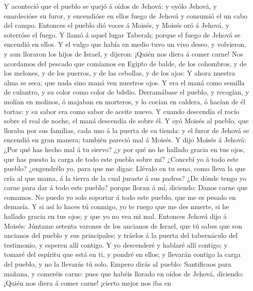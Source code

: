  Y aconteció que el pueblo se quejó á oídos de Jehová: y
oyólo Jehová, y enardecióse su furor, y encendióse en ellos fuego de
Jehová y consumió el un cabo del campo.  Entonces el pueblo
dió voces á Moisés, y Moisés oró á Jehová, y soterróse el fuego.
 Y llamó á aquel lugar Taberah; porque el fuego de Jehová se
encendió en ellos.  Y el vulgo que había en medio tuvo un
vivo deseo, y volvieron, y aun lloraron los hijos de Israel, y dijeron:
¡Quién nos diera á comer carne!  Nos acordamos del pescado
que comíamos en Egipto de balde, de los cohombros, y de los melones, y
de los puerros, y de las cebollas, y de los ajos:  Y ahora
nuestra alma se seca; que nada sino maná ven nuestros ojos. 
Y era el maná como semilla de culantro, y su color como color de bdelio.
 Derramábase el pueblo, y recogían, y molían en molinos, ó
majaban en morteros, y lo cocían en caldera, ó hacían de él tortas: y su
sabor era como sabor de aceite nuevo.  Y cuando descendía el
rocío sobre el real de noche, el maná descendía de sobre él.
 Y oyó Moisés al pueblo, que lloraba por sus familias, cada
uno á la puerta de su tienda: y el furor de Jehová se encendió en gran
manera; también pareció mal á Moisés.  Y dijo Moisés á
Jehová: ¿Por qué has hecho mal á tu siervo? ¿y por qué no he hallado
gracia en tus ojos, que has puesto la carga de todo este pueblo sobre
mí?  ¿Concebí yo á todo este pueblo? ¿engendrélo yo, para
que me digas: Llévalo en tu seno, como lleva la que cría al que mama, á
la tierra de la cual juraste á sus padres?  ¿De dónde tengo
yo carne para dar á todo este pueblo? porque lloran á mí, diciendo:
Danos carne que comamos.  No puedo yo solo soportar á todo
este pueblo, que me es pesado en demasía.  Y si así lo
haces tú conmigo, yo te ruego que me des muerte, si he hallado gracia en
tus ojos; y que yo no vea mi mal.  Entonces Jehová dijo á
Moisés: Júntame setenta varones de los ancianos de Israel, que tú sabes
que son ancianos del pueblo y sus principales; y tráelos á la puerta del
tabernáculo del testimonio, y esperen allí contigo.  Y yo
descenderé y hablaré allí contigo; y tomaré del espíritu que está en ti,
y pondré en ellos; y llevarán contigo la carga del pueblo, y no la
llevarás tú solo.  Empero dirás al pueblo: Santificaos para
mañana, y comeréis carne: pues que habéis llorado en oídos de Jehová,
diciendo: ¡Quién nos diera á comer carne! ¡cierto mejor nos iba en
